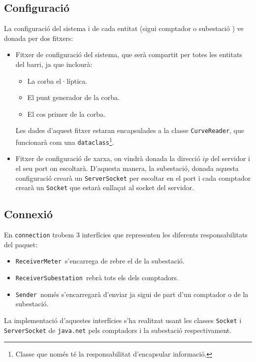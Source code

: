 \subsection{Configuració}
La configuració del sistema i de cada entitat (sigui comptador o subestació ) ve donada per dos fitxers:
\begin{itemize}
	\item Fitxer de configuració del sistema, que serà compartit per totes les entitats del barri, ja que inclourà:
	\begin{itemize}
		\item La corba el·líptica.
		\item El punt generador de la corba.
		\item El cos primer de la corba.
	\end{itemize}
	Les dades d'aquest fitxer estaran encapsulades a la classe \texttt{CurveReader}, que funcionarà com una \texttt{dataclass}\footnote{Classe que només té la responsabilitat d'encapsular informació.}.
	
	\item Fitxer de configuració de xarxa, on vindrà donada la direcció $ip$ del servidor i el seu port on escoltarà. D'aquesta manera, la subestació, donada aquesta configuració crearà un \texttt{ServerSocket} per escoltar en el port i cada comptador crearà un \texttt{Socket} que estarà enllaçat al socket del servidor.
\end{itemize}
\subsection{Connexió}
En \texttt{connection} trobem 3 interfícies que representen les diferents responsabilitats del paquet:
\begin{itemize}
	\item \texttt{ReceiverMeter }s'encarrega de rebre el \dto de la subestació.
	\item \texttt{ReceiverSubestation }rebrà tots els \dto dels comptadors.
	\item \texttt{Sender }només s'encarregarà d'enviar \dto ja sigui de part d'un comptador o de la subestació.
\end{itemize}
La implementació d'aquestes interfícies s'ha realitzat usant les classes \texttt{Socket} i \texttt{ServerSocket} de \texttt{java.net} pels comptadors i la subestació respectivament.
